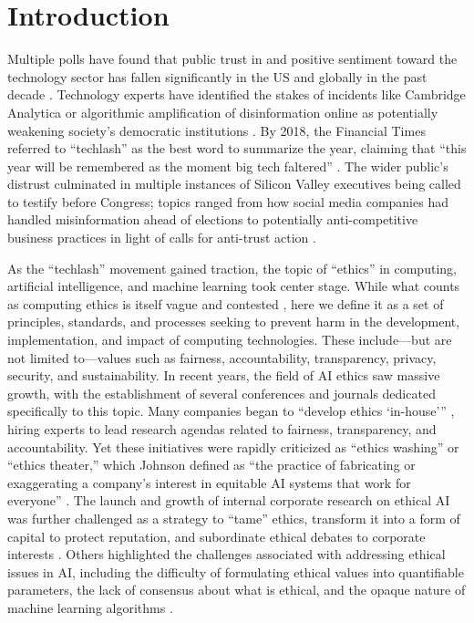 \documentclass[sigconf]{acmart}
\begin{document}
\section{Introduction}
Multiple polls have found that public trust in and positive sentiment toward the technology sector has fallen significantly in the US and globally in the past decade \cite{west_techlash_2021, gallup_techlash_2020}. Technology experts have identified the stakes of incidents like Cambridge Analytica \cite{chang_facebook_2018} or algorithmic amplification of disinformation online \cite{menczer_information_2020} as potentially weakening society’s democratic institutions \cite{anderson_many_2020}. By 2018, the Financial Times referred to “techlash” as the best word to summarize the year, claiming that “this year will be remembered as the moment big tech faltered” \cite{foroohar_year_2018}. The wider public’s distrust culminated in multiple instances of Silicon Valley executives being called to testify before Congress; topics ranged from how social media companies had handled misinformation ahead of elections \cite{frenkel_big_2018} to potentially anti-competitive business practices in light of calls for anti-trust action \cite{romm_amazon_2020}.

As the “techlash” movement gained traction, the topic of “ethics” in computing, artificial intelligence, and machine learning took center stage. While what counts as computing ethics is itself vague and contested \cite{metcalf_owning_2019}, here we define it as a set of principles, standards, and processes seeking to prevent harm in the development, implementation, and impact of computing technologies. These include---but are not limited to---values such as fairness, accountability, transparency, privacy, security, and sustainability. In recent years, the field of AI ethics saw massive growth, with the establishment of several conferences and journals dedicated specifically to this topic. Many companies began to “develop ethics ‘in-house’” \cite{phan_economies_2021}, hiring  experts to lead research agendas related to fairness, transparency, and accountability. Yet these initiatives were rapidly criticized as “ethics washing” or “ethics theater,” which Johnson defined as “the practice of fabricating or exaggerating a company’s interest in equitable AI systems that work for everyone” \cite{johnson_how_2019}. The launch and growth of internal corporate research on ethical AI was further challenged as a strategy to “tame” ethics, transform it into a form of capital to protect reputation, and subordinate ethical debates to corporate interests \cite{phan_economies_2021, phan_economies_2022, metcalf_owning_2019}. Others highlighted the challenges associated with addressing ethical issues in AI, including the difficulty of formulating ethical values into quantifiable parameters, the lack of consensus about what is ethical, and the opaque nature of machine learning algorithms \cite{polonski_hard_2018}.
\end{document}
